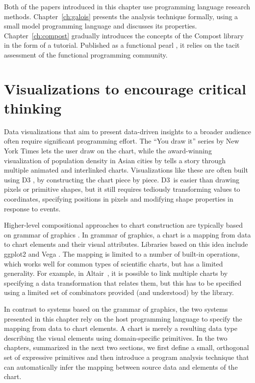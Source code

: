 \documentclass[fleqn,11pt]{report}
\theoremstyle{definition}
\begin{document}
Both of the papers introduced in this chapter use programming language research methods.
Chapter~\ref{ch:galois} presents the analysis technique formally, using a small model
programming language and discusses its properties. Chapter~\ref{ch:compost} gradually introduces
the concepts of the Compost library in the form of a tutorial. Published as a
functional pearl \citep{gibbons-2010-pearl}, it relies on the tacit assessment of the functional
programming community.

\section{Visualizations to encourage critical thinking}

Data visualizations that aim to present data-driven insights to a broader audience often
require significant programming effort. The ``You draw it'' series by New York Times
\citep{aisch-2015-youdraw} lets the user draw on the chart, while the award-winning visualization
of population density in Asian cities by \cite{bremer-2015-asia} tells a story through multiple
animated and interlinked charts. Visualizations like these are often built using D3
\citep{bostock-2011-d3}, by constructing the chart piece by piece. D3~is easier than drawing
pixels or primitive shapes, but it still requires tediously transforming values to coordinates,
specifying positions in pixels and modifying shape properties in response to events.

Higher-level compositional approaches to chart construction are typically based on grammar of
graphics \citep{wilkinson-1999-grammar}. In grammar of graphics, a chart is a mapping from
data to chart elements and their visual attributes. Libraries based on this idea include
ggplot2 \citep{satyanaran-2016-vega,wickham-2016-ggplot2} and Vega \citep{wickham-2010-layered}.
The mapping is limited to a number of built-in operations, which works well for common types of
scientific charts, but has a limited generality. For example, in Altair~\citep{vanderplas-2018-altair},
it is possible to link multiple charts by specifying a data transformation that relates them,
but this has to be specified using a limited set of combinators provided (and understood) by the
library.

In contrast to systems based on the grammar of graphics, the two systems presented in this chapter
rely on the host programming language to specify the mapping from data to chart elements. A chart
is merely a resulting data type describing the visual elements using domain-specific primitives.
In the two chapters, summarized in the next two sections, we first define a small, orthogonal set
of expressive primitives and then introduce a program analysis technique that can automatically
infer the mapping between source data and elements of the chart.
\end{document}
